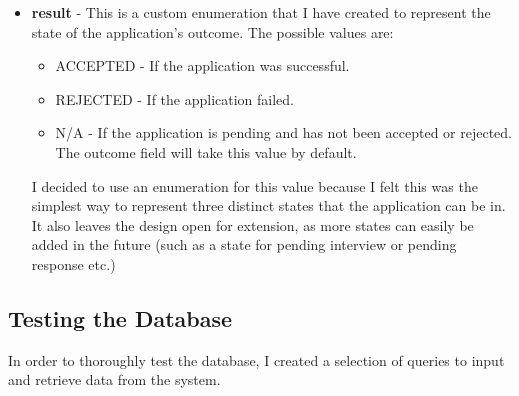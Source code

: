 \documentclass{article}
\begin{document}
\begin{itemize}
\item \textbf{result} - This is a custom enumeration that I have created to represent the state of the application's outcome. The possible values are:

\begin{itemize}
	\item ACCEPTED - If the application was successful.
	\item REJECTED - If the application failed.
	\item N/A - If the application is pending and has not been accepted or rejected. The outcome field will take this value by default.
\end{itemize}

I decided to use an enumeration for this value because I felt this was the simplest way to represent three distinct states that the application can be in. It also leaves the design open for extension, as more states can easily be added in the future (such as a state for pending interview or pending response etc.)

\end{itemize}

\subsection{Testing the Database}
In order to thoroughly test the database, I created a selection of queries to input and retrieve data from the system. 
\end{document}

